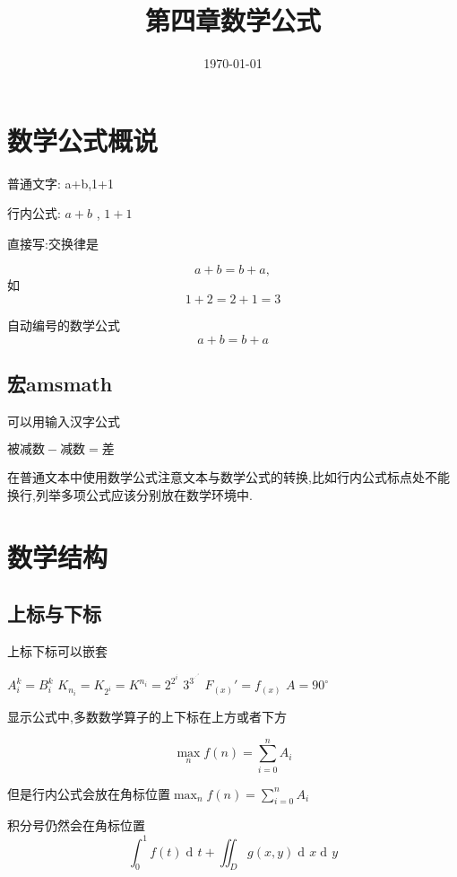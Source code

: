 \documentclass[UTF8]{ctexart}
\title{第四章数学公式}
\date{\today}
\DeclareMathOperator\dif{d\!}
\begin{document}
  \maketitle
  \section{数学公式概说}
    普通文字: a+b,1+1

    行内公式: $a+b$ , $1+1$

    直接写:交换律是

    \[ a+b = b+a, \]
    如
    \[
      1+2=2+1=3
    \]

    自动编号的数学公式
    \begin{equation}
      a+b = b+a\label{eq:communtative}
    \end{equation}

    \subsection{宏amsmath}
      可以用输入汉字公式

      $\text{被减数} - \text{减数} = \text{差}$

      在普通文本中使用数学公式注意文本与数学公式的转换,比如行内公式标点处不能换行,列举多项公式应该分别放在数学环境中.
  \section{数学结构}
    \subsection{上标与下标}
      上标下标可以嵌套

        $A_i^k = B^k_i$\qquad
        $K_{n_i} = K_{2^i} = K^{n_i} = 2^{2^i}$\qquad
        $3^{3^{\cdot^{\cdot^{\cdot^3}}}}$
        $F_{(x)}' = f_{(x)}$
        $ A = 90^\circ$

      显示公式中,多数数学算子的上下标在上方或者下方

        \[
          \max_n f(n) = \sum_{i=0}^n A_i
        \]

      但是行内公式会放在角标位置$\max_n f(n) = \sum_{i=0}^n A_i$

      积分号仍然会在角标位置
        \[ \int_0^1 f(t) \dif t + \iint_D g(x,y) \dif x \dif y\]
\end{document}
